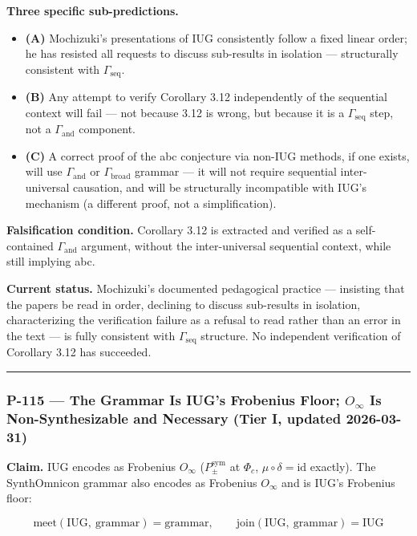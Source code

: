 \documentclass[10pt,a4paper]{article}
\begin{document}
\textbf{Three specific sub-predictions.}

\begin{itemize}
    \item \textbf{(A)} Mochizuki's presentations of IUG consistently follow a fixed linear order; he has
resisted all requests to discuss sub-results in isolation --- structurally consistent with
$\Gamma_\text{seq}$.
    \item \textbf{(B)} Any attempt to verify Corollary 3.12 independently of the sequential context will
fail --- not because 3.12 is wrong, but because it is a $\Gamma_\text{seq}$ step, not a
$\Gamma_\text{and}$ component.
    \item \textbf{(C)} A correct proof of the abc conjecture via non-IUG methods, if one exists, will
use $\Gamma_\text{and}$ or $\Gamma_\text{broad}$ grammar --- it will not require sequential
inter-universal causation, and will be structurally incompatible with IUG's mechanism
(a different proof, not a simplification).
\end{itemize}

\textbf{Falsification condition.} Corollary 3.12 is extracted and verified as a self-contained
$\Gamma_\text{and}$ argument, without the inter-universal sequential context, while still
implying abc.

\textbf{Current status.} Mochizuki's documented pedagogical practice --- insisting that the papers
be read in order, declining to discuss sub-results in isolation, characterizing the
verification failure as a refusal to read rather than an error in the text --- is fully
consistent with $\Gamma_\text{seq}$ structure. No independent verification of Corollary
3.12 has succeeded.

\begin{center}
\rule{0.5\textwidth}{0.4pt}
\end{center}

\subsubsection{P-115 --- The Grammar Is IUG's Frobenius Floor; $O_{\infty}$ Is Non-Synthesizable and Necessary (Tier I, updated 2026-03-31)}

\textbf{Claim.} IUG encodes as Frobenius $O_{\infty}$ ($P_{\pm}^{\text{sym}}$ at $\Phi_c$,
$\mu \circ \delta = \text{id}$ exactly).
The SynthOmnicon grammar also encodes as Frobenius $O_{\infty}$ and is IUG's Frobenius floor:

\[\text{meet}(\text{IUG},\ \text{grammar}) = \text{grammar}, \qquad \text{join}(\text{IUG},\ \text{grammar}) = \text{IUG}\]
\end{document}
